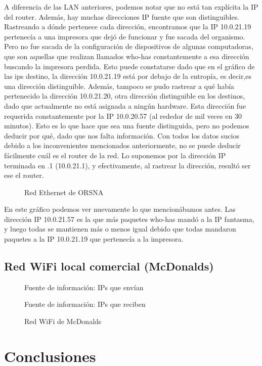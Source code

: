 \documentclass[a4paper, 11pt]{article}
\newcommand{\ponerGrafico}[4]
{\begin{figure}[H]
  \centering
  \subfloat{\hspace{-3.5cm}\texttt{[image: \#1]}}
  \caption{#2} \label{fig:#4}
\end{figure}
}
\begin{document}
A diferencia de las LAN anteriores, podemos notar que no est\'a tan expl\'icita la IP del router. Adem\'as, hay muchas direcciones IP fuente que son distinguibles. Rastreando a d\'onde pertenece cada dirección, encontramos que la IP 10.0.21.19 pertenec\'ia a una impresora que dej\'o de funcionar y fue sacada del organismo. Pero no fue sacada de la configuraci\'on de dispositivos de algunas computadoras, que son aquellas que realizan llamados who-has constantemente a esa direcci\'on buscando la impresora perdida. Esto puede constatarse dado que en el gr\'afico de las ips destino, la direcci\'on 10.0.21.19 est\'a por debajo de la entrop\'ia, es decir,es una direcci\'on distinguible.
Adem\'as, tampoco se pudo rastrear a qu\'e hab\'ia pertenecido la direcci\'on 10.0.21.20, otra direcci\'on distinguible en los destinos, dado que actualmente no est\'a asignada a ning\'un hardware. Esta direcci\'on fue requerida constantemente por la IP 10.0.20.57 (al rededor de mil veces en 30 minutos). Esto es lo que hace que sea una fuente distinguida, pero no podemos deducir por qu\'e, dado que nos falta informaci\'on.
Con todos los datos sucios debido a los inconvenientes mencionados anteriormente, no se puede deducir f\'acilmente  cu\'al es el router de la red. Lo suponemos por la direcci\'on IP terminada en .1 (10.0.21.1), y efectivamente, al rastrear la direcci\'on, result\'o ser ese el router.

\ponerGrafico{graficos/orsna_grafo.png}{Red Ethernet de ORSNA}{0.5}{label}

En este gr\'afico podemos ver nuevamente lo que mencion\'abamos antes. Las direcci\'on IP 10.0.21.57 es la que m\'as paquetes who-has mand\'o a la IP fantasma, y luego todas se mantienen m\'as o menos igual debido que todas mandaron paquetes a la IP 10.0.21.19 que pertenec\'ia a la impresora.

\subsection{Red WiFi local comercial (McDonalds)}
\ponerGrafico{graficos/mcdonalds_entropia.png}{Fuente de informaci\'on: IPs que env\'ian}{0.5}{label}
\ponerGrafico{graficos/mcdonalds_entropia_rcv.png}{Fuente de informaci\'on: IPs que reciben}{0.5}{label}
\ponerGrafico{graficos/mcdonalds_grafo.png}{Red WiFi de McDonalds}{0.5}{label}
\section{Conclusiones}
\end{document}
